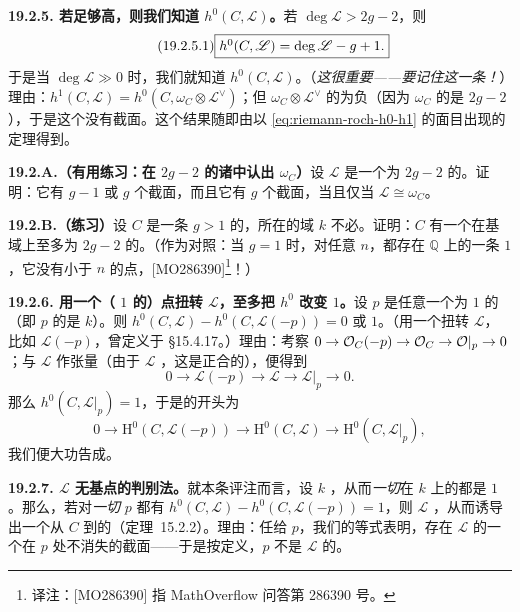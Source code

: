 \textbf{19.2.5. 若\trDegree{}足够高，则我们知道 $h^0(C,\mathscr{L})$。}\quad 若 $\deg\mathscr{L}>2g-2$，则
\begin{equation*}\tag{19.2.5.1}\label{eq:h0-high-degree}
\fbox{$h^0(C,\mathscr{L})=\deg\mathscr{L}-g+1$.}
\end{equation*}
于是当 $\deg\mathscr{L}\gg 0$ 时，我们就知道 $h^0(C,\mathscr{L})$。（\emph{这很重要——要记住这一条！}）理由：$h^1(C,\mathscr{L})=h^0(C,\omega_C\otimes\mathscr{L}^{\vee})$；但 $\omega_C\otimes\mathscr{L}^{\vee}$ 的\trDegree{}为负（因为 $\omega_C$ 的\trDegree{}是 $2g-2$），于是这个\trInvertibleSheaf{}没有截面。这个结果随即由以 \eqref{eq:riemann-roch-h0-h1} 的面目出现的\trRiemannRoch{}定理得到。

\textbf{19.2.A.（有用练习：在\trDegree{} $2g-2$ 的诸\trLineBundle{}中认出 $\omega_C$）}\quad 设 $\mathscr{L}$ 是一个\trDegree{}为 $2g-2$ 的\trInvertibleSheaf。证明：它有 $g-1$ 或 $g$ 个截面，而且它有 $g$ 个截面，当且仅当 $\mathscr{L}\cong\omega_C$。

\textbf{19.2.B.（练习）}\quad 设 $C$ 是一条\trGenus{} $g>1$ 的\trCurve，所在的域 $k$ 不必\trAlgClosed。证明：$C$ 有一个在基域上\trDegree{}至多为 $2g-2$ 的\trClosedPoint。（作为对照：当 $g=1$ 时，对任意 $n$，都存在 $\mathbb{Q}$ 上的一条\trGenus{} $1$ \trCurve，它没有\trDegree{}小于 $n$ 的点，[MO286390]\footnote{译注：[MO286390] 指 MathOverflow 问答第 286390 号。}！）

\textbf{19.2.6. 用一个（\trDegree{} $1$ 的）点扭转 $\mathscr{L}$，至多把 $h^0$ 改变 $1$。}\quad 设 $p$ 是任意一个\trDegree{}为 $1$ 的\trClosedPoint（即 $p$ 的\trResidueField{}是 $k$）。则 $h^0(C,\mathscr{L})-h^0(C,\mathscr{L}(-p))=0$ 或 $1$。（用一个\trDivisor{}扭转 $\mathscr{L}$，比如 $\mathscr{L}(-p)$，曾定义于 \S15.4.17。）理由：考察 $0\to\mathcal{O}_C(-p)\to\mathcal{O}_C\to\mathcal{O}|_{p}\to 0$；与 $\mathscr{L}$ 作张量（由于 $\mathscr{L}$ \trLocallyFree，这是正合的），便得到
\[
0\longrightarrow \mathscr{L}(-p)\longrightarrow \mathscr{L}\longrightarrow \mathscr{L}|_{p}\longrightarrow 0.
\]
那么 $h^0(C,\mathscr{L}|_{p})=1$，于是\trCohomology{}的\trLongExactSequence{}开头为
\[
0\longrightarrow \mathrm{H}^0(C,\mathscr{L}(-p))\longrightarrow \mathrm{H}^0(C,\mathscr{L})\longrightarrow \mathrm{H}^0(C,\mathscr{L}|_{p}),
\]
我们便大功告成。

\textbf{19.2.7. $\mathscr{L}$ 无基点的判别法。}\quad 就本条评注而言，设 $k$ \trAlgClosed，从而\emph{一切}\trClosedPoint{}在 $k$ 上的\trDegree{}都是 $1$。那么，若对\emph{一切}\trClosedPoint{} $p$ 都有 $h^0(C,\mathscr{L})-h^0(C,\mathscr{L}(-p))=1$，则 $\mathscr{L}$ \trBasePointFree，从而诱导出一个从 $C$ 到\trProjectiveSpace{}的\trMorphism（\mbox{定理~15.2.2}）。理由：任给 $p$，我们的等式表明，存在 $\mathscr{L}$ 的一个在 $p$ 处不消失的截面——于是按定义，$p$ 不是 $\mathscr{L}$ 的\trBasePoint。

